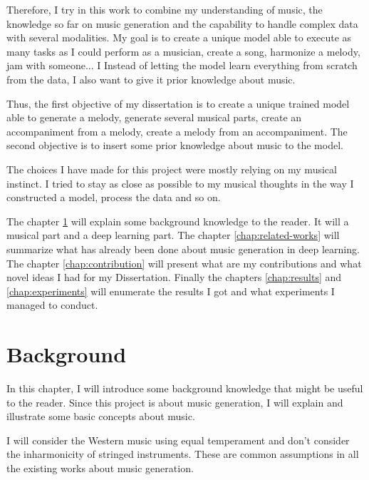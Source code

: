 \documentclass[12pt]{report}
\begin{document}
Therefore, I try in this work to combine my understanding of music, the knowledge so far on music generation and the capability to handle complex data with several modalities.
My goal is to create a unique model able to execute as many tasks as I could perform as a musician, create a song, harmonize a melody, jam with someone... I 
Instead of letting the model learn everything from scratch from the data, I also want to give it prior knowledge about music.

Thus, the first objective of my dissertation is to create a unique trained model able to generate a melody, generate several musical parts, create an accompaniment from a melody, create a melody from an accompaniment.
The second objective is to insert some prior knowledge about music to the model.

The choices I have made for this project were mostly relying on my musical instinct.
I tried to stay as close as possible to my musical thoughts in the way I constructed a model, process the data and so on.

The chapter \ref{chap:background} will explain some background knowledge to the reader.
It will a musical part and a deep learning part.
The chapter \ref{chap:related-works} will summarize what has already been done about music generation in deep learning.
The chapter \ref{chap:contribution} will present what are my contributions and what novel ideas I had for my Dissertation.
Finally the chapters \ref{chap:results} and \ref{chap:experiments} will enumerate the results I got and what experiments I managed to conduct.


\chapter{Background}
\label{chap:background}

In this chapter, I will introduce some background knowledge that might be useful to the reader. Since this project is about music generation, I will explain and illustrate some basic concepts about music.

I will consider the Western music using equal temperament and don't consider the inharmonicity of stringed instruments. These are common assumptions in all the existing works about music generation.
\end{document}
